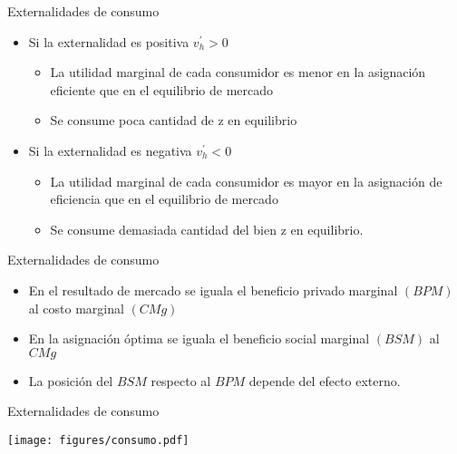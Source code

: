 \begin{frame}{Externalidades de consumo}
	\begin{itemize}
		\item Si la externalidad es positiva $v_{h}^{\prime} > 0$
				\begin{itemize}
					\item La utilidad marginal de cada consumidor es menor en la asignación eficiente que en el equilibrio de mercado
					\item Se consume poca cantidad de z en equilibrio
				\end{itemize}
		\item Si la externalidad es negativa $v_{h}^{\prime} < 0$
				\begin{itemize}
					\item La utilidad marginal de cada consumidor es mayor en la asignación de eficiencia que en el equilibrio de mercado
					\item Se consume demasiada cantidad del bien z en equilibrio.
				\end{itemize}
	\end{itemize}
\end{frame}
\begin{frame}{Externalidades de consumo}
	\begin{multicols}{2}
		\begin{itemize}
			\item En el resultado de mercado se iguala el beneficio privado marginal $(BPM)$ al costo marginal $(CMg)$
			\item En la asignación óptima se iguala el beneficio social marginal $(BSM)$ al $CMg$
			\item La posición del $BSM$ respecto al $BPM$ depende del efecto externo.
		\end{itemize}
		
		\begin{center}
			
		\end{center}
	\end{multicols}
\end{frame}
\begin{frame}{Externalidades de consumo}
	\begin{center}
		\texttt{[image: figures/consumo.pdf]}
	\end{center}
\end{frame}